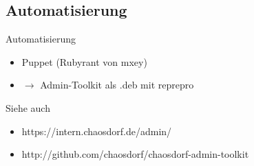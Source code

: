 \documentclass{beamer}
\begin{document}
\subsection{Automatisierung}
\begin{frame}{Automatisierung}
	\begin{itemize}
		\item Puppet (Rubyrant von mxey)
		\pause \item $\rightarrow$ Admin-Toolkit als .deb mit reprepro
	\end{itemize}
\end{frame}

\begin{frame}{Siehe auch}
	\begin{itemize}
		\item https://intern.chaosdorf.de/admin/
		\item http://github.com/chaosdorf/chaosdorf-admin-toolkit
	\end{itemize}
\end{frame}
\end{document}
